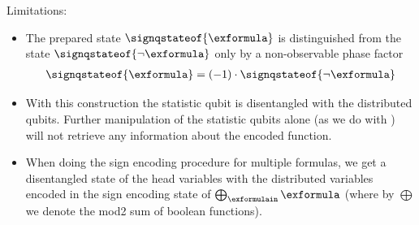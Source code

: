 Limitations:
\begin{itemize}
    \item The prepared state $\signqstateof{\exformula}$ is distinguished from the state $\signqstateof{\lnot\exformula}$ only by a non-observable phase factor
    \begin{align*}
        \signqstateof{\exformula}
        = (-1) \cdot \signqstateof{\lnot\exformula}
    \end{align*}
    \item With this construction the statistic qubit is disentangled with the distributed qubits.
    Further manipulation of the statistic qubits alone (as we do with \activationCircuits{}) will not retrieve any information about the encoded function.
    \item When doing the sign encoding procedure for multiple formulas, we get a disentangled state of the head variables with the distributed variables encoded in the sign encoding state of $\bigoplus_{\exformulain}\exformula$ (where by $\bigoplus$ we denote the mod2 sum of boolean functions).
\end{itemize}


